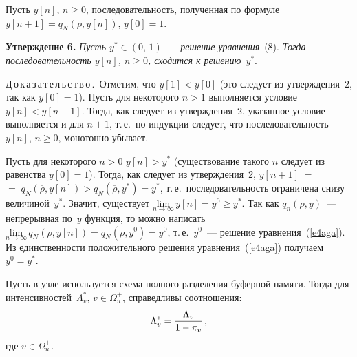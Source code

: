 \begin{multicols}{2}
    Пусть $y[n]$, $n\geq 0$, последовательность, полученная по формуле 
$y[n+1]=q_N(\overline{\rho},y[n])$, $y[0]=1$.

\medskip

\noindent
\textbf{Утверждение 6.} \textit{Пусть $y^*\in (0,\,1)$~--- решение 
уравнения}~(8). \textit{Тогда последовательность $y[n]$, $n\geq 0$, сходится 
к решению~$y^*$}.

\medskip

\noindent
Д\,о\,к\,а\,з\,а\,т\,е\,л\,ь\,с\,т\,в\,о\,.\ Отметим, что $y[1]<y[0]$ (это следует из 
утверждения~2, так как $y[0]=1$). Пусть для некоторого $n>1$ выполняется 
условие $y[n]<y[n-1]$. Тогда, как следует из утверждения~2, указанное условие 
выполняется и для $n+1$, т.\,е.\ по индукции следует, что последовательность 
$y[n]$, $n\geq 0$, монотонно убывает. 

    Пусть для некоторого $n>0$ $y[n]>y^*$ (существование такого $n$ 
следует из равенства $y[0]=1$). Тогда, как следует из утверждения~2, 
$y[n+1]\;=$\linebreak $=\;q_N(\overline{\rho},y[n])>q_N(\overline{\rho},y^*) =y^*$, т.\,е.\ 
последовательность ограничена снизу величиной~$y^*$. Значит, существует 
$\underset{n\rightarrow \infty}{\mathrm{lim}}\,y[n]=y^0\geq y^*$. Так как 
$q_n(\overline{\rho},y)$~--- непрерывная по~$y$ функция, то можно написать 
$\underset{n\rightarrow 
\infty}{\mathrm{lim}}\,q_N(\overline{\rho},y[n])=q_N(\overline{\rho},y^0)=y^0$, 
т.\,е.\ $y^0$~--- решение уравнения~(\ref{e4aga}). Из единственности 
положительного решения уравнения~(\ref{e4aga}) получаем $y^0=y^*$.

    Пусть в узле используется схема полного разделения буферной памяти. 
Тогда для интенсив\-ностей~$\Lambda_v^*$, $v\in\Omega_u^+$, справедливы 
соотношения:
$$
\Lambda_v^* = \displaystyle\frac{\displaystyle \Lambda_v\mathstrut}{\displaystyle 1-\pi_v\mathstrut}\,,
$$
где $v\in\Omega_u^+$.



\end{multicols}
